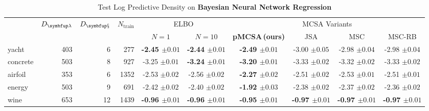 
\begin{table}[h]
  \vspace{-0.1in}
  \centering
  \caption{Test Log Predictive Density on \textbf{Bayesian Neural Network Regression}}\label{table:bnn}
  \setlength{\tabcolsep}{2pt}
  \begin{threeparttable}
  \begin{tabular}{lrrrcccccc}
    \toprule
    & \multicolumn{1}{c}{\multirow{2}{*}{\(D_{\mathcal{\vlambda}}\)}} & \multicolumn{1}{c}{\multirow{2}{*}{\(D_{\mathcal{\vx}}\)}} &  \multicolumn{1}{c}{\multirow{2}{*}{\(N_{\text{train}}\)}} & \multicolumn{2}{c}{\multirow{1}{*}{ELBO}} & \multicolumn{4}{c}{MCSA Variants} \\\cmidrule(lr){5-6}\cmidrule(lr){7-10}
  & & & & {\footnotesize\(N=1\)} & {\footnotesize\(N=10\)} & \multicolumn{1}{c}{\multirow{1}{*}{\footnotesize{\textbf{pMCSA{\scriptsize\,(ours)}}}}} & \multicolumn{1}{c}{\multirow{1}{*}{\footnotesize{JSA}}} & \multicolumn{1}{c}{\multirow{1}{*}{\footnotesize{MSC}}} & \multicolumn{1}{c}{\multirow{1}{*}{\footnotesize{MSC-RB}}}\\
    \midrule
    \textsf{yacht} & 403 & 6 & 277 & {\bf-2.45 {\scriptsize{\(\pm 0.01\)}}} & {\bf-2.44 {\scriptsize{\(\pm 0.01\)}}} & {\bf-2.49 {\scriptsize{\(\pm 0.01\)}}} & {-3.00 {\scriptsize{\(\pm 0.05\)}}} & {-2.98 {\scriptsize{\(\pm 0.04\)}}} & {-2.98 {\scriptsize{\(\pm 0.04\)}}}\\
    \textsf{concrete} & 503 & 8 & 927 & {-3.25 {\scriptsize{\(\pm 0.01\)}}} & {\bf-3.24 {\scriptsize{\(\pm 0.01\)}}} & {\bf-3.20 {\scriptsize{\(\pm 0.01\)}}} & {-3.33 {\scriptsize{\(\pm 0.02\)}}} & {-3.32 {\scriptsize{\(\pm 0.02\)}}} & {-3.33 {\scriptsize{\(\pm 0.02\)}}}\\
    \textsf{airfoil} & 353 & 6 & 1352 & {-2.53 {\scriptsize{\(\pm 0.02\)}}} & {-2.56 {\scriptsize{\(\pm 0.02\)}}} & {\bf-2.27 {\scriptsize{\(\pm 0.02\)}}} & {-2.51 {\scriptsize{\(\pm 0.02\)}}} & {-2.53 {\scriptsize{\(\pm 0.01\)}}} & {-2.51 {\scriptsize{\(\pm 0.01\)}}}\\
    \textsf{energy} & 503 & 9 & 691 & {-2.42 {\scriptsize{\(\pm 0.02\)}}} & {-2.40 {\scriptsize{\(\pm 0.02\)}}} & {\bf-1.92 {\scriptsize{\(\pm 0.03\)}}} & {-2.38 {\scriptsize{\(\pm 0.02\)}}} & {-2.37 {\scriptsize{\(\pm 0.02\)}}} & {-2.36 {\scriptsize{\(\pm 0.02\)}}}\\
    \textsf{wine} & 653 & 12 & 1439 & {\bf-0.96 {\scriptsize{\(\pm 0.01\)}}} & {\bf-0.96 {\scriptsize{\(\pm 0.01\)}}} & {\bf-0.95 {\scriptsize{\(\pm 0.01\)}}} & {\bf-0.97 {\scriptsize{\(\pm 0.01\)}}} & {\bf-0.97 {\scriptsize{\(\pm 0.01\)}}} & {\bf-0.97 {\scriptsize{\(\pm 0.01\)}}} \\

\end{tabular}
\end{threeparttable}
\end{table}
